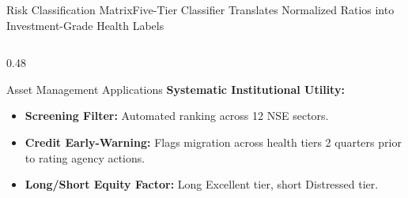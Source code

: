 \begin{frame}{Risk Classification Matrix}{Five-Tier Classifier Translates Normalized Ratios into Investment-Grade Health Labels}
\begin{columns}[T]
\begin{column}{0.48\textwidth}
            \begin{quantcard}[height=2.75cm]{Asset Management Applications}
                \fontsize{6.3pt}{8pt}\selectfont
                \textbf{\color{deepemerald}Systematic Institutional Utility:}
                \begin{itemize}
                    \setlength{\itemsep}{1.5pt}
                    \item \textbf{Screening Filter:} Automated ranking across 12 NSE sectors.
                    \item \textbf{Credit Early-Warning:} Flags migration across health tiers 2 quarters prior to rating agency actions.
                    \item \textbf{Long/Short Equity Factor:} Long Excellent tier, short Distressed tier.
                \end{itemize}
                \vfill
            \end{quantcard}
        \end{column}
    \end{columns}

    \vspace{0.1cm}
    \hfill {}
\end{frame}
